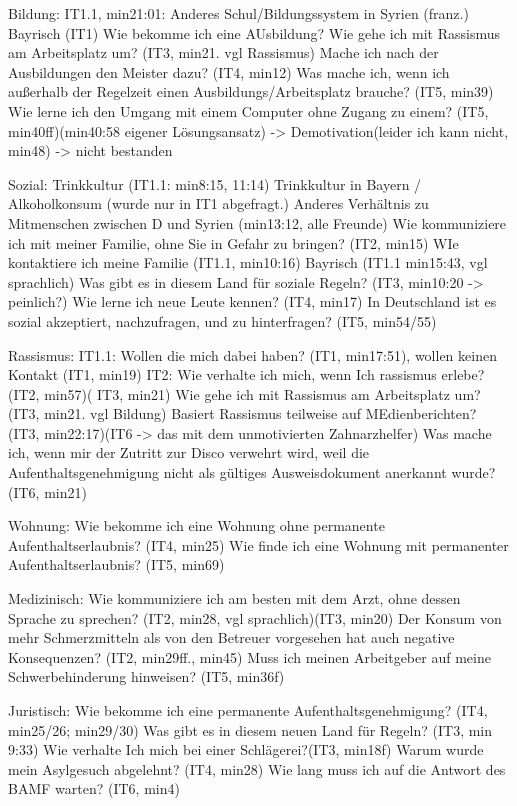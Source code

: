 

Bildung:
    IT1.1, min21:01: Anderes Schul/Bildungssystem in Syrien (franz.)
    Bayrisch (IT1)
    Wie bekomme ich eine AUsbildung?
    Wie gehe ich mit Rassismus am Arbeitsplatz um? (IT3, min21. vgl Rassismus)
    Mache ich nach der Ausbildungen den Meister dazu? (IT4, min12)
    Was mache ich, wenn ich außerhalb der Regelzeit einen Ausbildungs/Arbeitsplatz brauche? (IT5, min39)
    Wie lerne ich den Umgang mit einem Computer ohne Zugang zu einem? (IT5, min40ff)(min40:58 eigener              Lösungsansatz) -> Demotivation(leider ich kann nicht, min48) -> nicht bestanden
    
    
Sozial:
    Trinkkultur (IT1.1: min8:15, 11:14)
        Trinkkultur in Bayern / Alkoholkonsum (wurde nur in IT1 abgefragt.)
    Anderes Verhältnis zu Mitmenschen zwischen D und Syrien (min13:12, alle Freunde)
    Wie kommuniziere ich mit meiner Familie, ohne Sie in Gefahr zu    bringen? (IT2, min15)
    WIe kontaktiere ich meine Familie (IT1.1, min10:16)
    Bayrisch (IT1.1 min15:43, vgl sprachlich)
    Was gibt es in diesem Land für soziale Regeln? (IT3, min10:20 -> peinlich?)
    Wie lerne ich neue Leute kennen? (IT4, min17)
        In Deutschland ist es sozial akzeptiert, nachzufragen, und zu hinterfragen? (IT5, min54/55)
        
Rassismus:
    IT1.1: Wollen die mich dabei haben? (IT1, min17:51), wollen keinen Kontakt (IT1, min19)
    IT2: Wie verhalte ich mich, wenn Ich rassismus erlebe? (IT2, min57)( IT3, min21)
    Wie gehe ich mit Rassismus am Arbeitsplatz um? (IT3, min21. vgl Bildung)
    Basiert Rassismus teilweise auf MEdienberichten? (IT3, min22:17)(IT6 -> das mit dem unmotivierten Zahnarzhelfer)
    Was mache ich, wenn mir der Zutritt zur Disco verwehrt wird, weil die Aufenthaltsgenehmigung nicht als gültiges Ausweisdokument anerkannt wurde? (IT6, min21)
    
Wohnung:
    Wie bekomme ich eine Wohnung ohne permanente Aufenthaltserlaubnis? (IT4, min25)
    Wie finde ich eine Wohnung mit permanenter Aufenthaltserlaubnis? (IT5, min69)
    
Medizinisch:
    Wie kommuniziere ich am besten mit dem Arzt, ohne dessen Sprache zu sprechen? (IT2, min28, vgl sprachlich)(IT3, min20)
    Der Konsum von mehr Schmerzmitteln als von den Betreuer vorgesehen hat auch 
    negative Konsequenzen? (IT2, min29ff., min45)
    Muss ich meinen Arbeitgeber auf meine Schwerbehinderung hinweisen? (IT5, min36f)
    
    
Juristisch:
    Wie bekomme ich eine permanente Aufenthaltsgenehmigung? (IT4, min25/26; min29/30)
    Was gibt es in diesem neuen Land für Regeln? (IT3, min 9:33)
    Wie verhalte Ich mich bei einer Schlägerei?(IT3, min18f)
    Warum wurde mein Asylgesuch abgelehnt? (IT4, min28)
    Wie lang muss ich auf die Antwort des BAMF warten? (IT6, min4)
    
